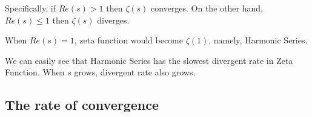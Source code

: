 \documentclass{article}
\begin{document}
  Specifically, if $Re(s) > 1$ then $\zeta(s)$ converges. On the other hand, $Re(s) \leq 1$ then $\zeta(s)$ diverges. 

  When $Re(s) = 1$, zeta function would become $\zeta(1)$, namely, Harmonic Series. 

  We can easily see that Harmonic Series has the slowest divergent rate in Zeta Function. When $s$ grows, divergent rate also grows. 







  \subsection{The rate of convergence}
\end{document}
